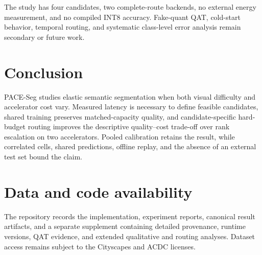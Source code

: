 \documentclass[a4paper,review,12pt]{elsarticle}
\newcommand{\method}{PACE-Seg}
\begin{document}
The study has four candidates, two complete-route backends, no external energy measurement, and no compiled INT8 accuracy. Fake-quant QAT, cold-start behavior, temporal routing, and systematic class-level error analysis remain secondary or future work.

\section{Conclusion}
\label{sec:conclusion}

\method{} studies elastic semantic segmentation when both visual difficulty and accelerator cost vary. Measured latency is necessary to define feasible candidates, shared training preserves matched-capacity quality, and candidate-specific hard-budget routing improves the descriptive quality--cost trade-off over rank escalation on two accelerators. Pooled calibration retains the result, while correlated cells, shared predictions, offline replay, and the absence of an external test set bound the claim.

\section*{Data and code availability}

The repository records the implementation, experiment reports, canonical result artifacts, and a separate supplement containing detailed provenance, runtime versions, QAT evidence, and extended qualitative and routing analyses. Dataset access remains subject to the Cityscapes and ACDC licenses.
\end{document}
